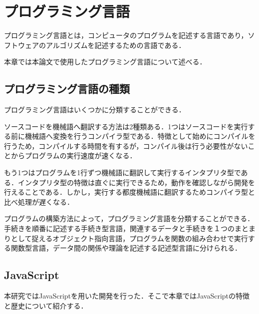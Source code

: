 \documentclass[a4j,12pt]{jsarticle}
\begin{document}
\section{プログラミング言語}
プログラミング言語とは，コンピュータのプログラムを記述する言語であり，ソフトウェアのアルゴリズムを記述するための言語である．

本章では本論文で使用したプログラミング言語について述べる．
\subsection{プログラミング言語の種類}
プログラミング言語はいくつかに分類することができる．

ソースコードを機械語へ翻訳する方法は2種類ある．1つはソースコードを実行する前に機械語へ変換を行うコンパイラ型である．特徴として始めにコンパイルを行うため，コンパイルする時間を有するが，コンパイル後は行う必要性がないことからプログラムの実行速度が速くなる．

もう1つはプログラムを1行ずつ機械語に翻訳して実行するインタプリタ型である．インタプリタ型の特徴は直ぐに実行できるため，動作を確認しながら開発を行えることである．しかし，実行する都度機械語に翻訳するためコンパイラ型と比べ処理が遅くなる．

プログラムの構築方法によって，プログラミング言語を分類することができる．手続きを順番に記述する手続き型言語，関連するデータと手続きを１つのまとまりとして捉えるオブジェクト指向言語，プログラムを関数の組み合わせで実行する関数型言語，データ間の関係や理論を記述する記述型言語に分けられる．

\subsection{JavaScript}
本研究ではJavaScriptを用いた開発を行った．そこで本章ではJavaScriptの特徴と歴史について紹介する．
\end{document}
